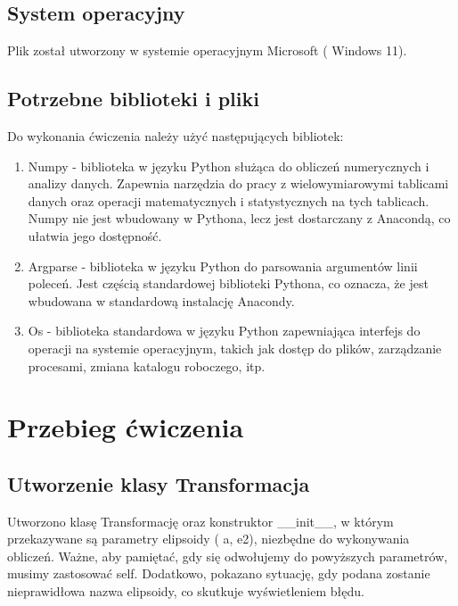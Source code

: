 \documentclass[10pt,a4paper]{article}
\begin{document}
	\subsection{System operacyjny}
	
	Plik został utworzony w systemie operacyjnym Microsoft ( Windows 11).
	
	\subsection{Potrzebne biblioteki i pliki}
	
	Do wykonania ćwiczenia należy użyć następujących bibliotek:
	\begin{enumerate}

	\item Numpy - biblioteka w języku Python służąca do obliczeń numerycznych i analizy danych. Zapewnia narzędzia do pracy z wielowymiarowymi tablicami danych oraz operacji matematycznych i statystycznych na tych tablicach. Numpy nie jest wbudowany w Pythona, lecz jest dostarczany z Anacondą, co ułatwia jego dostępność.
	\item Argparse - biblioteka w języku Python do parsowania argumentów linii poleceń. Jest częścią standardowej biblioteki Pythona, co oznacza, że jest wbudowana w standardową instalację Anacondy.
	\item Os - biblioteka standardowa w języku Python zapewniająca interfejs do operacji na systemie operacyjnym, takich jak dostęp do plików, zarządzanie procesami, zmiana katalogu roboczego, itp.	
		
	\end{enumerate}
	\section{Przebieg ćwiczenia}
	
	\subsection{Utworzenie klasy Transformacja}
	Utworzono klasę Transformację oraz konstruktor __init__, w którym przekazywane są parametry elipsoidy ( a, e2), niezbędne do wykonywania obliczeń. Ważne, aby pamiętać, gdy się odwołujemy do powyższych parametrów, musimy zastosować self. Dodatkowo, pokazano sytuację, gdy podana zostanie nieprawidłowa nazwa elipsoidy, co skutkuje wyświetleniem błędu. 
	
\end{document}
